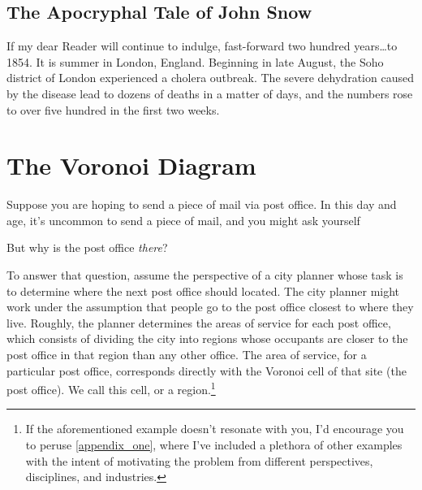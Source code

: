 \documentclass[12pt,twoside]{reedthesis}
\begin{document}
  \section{The Apocryphal Tale of John Snow} %
  \label{sec:the_apocryphal_tale_of_john_snow}
  If my dear Reader will continue to indulge, fast-forward two hundred years\ldots to 1854. It is summer in London, England. Beginning in late August, the Soho district of London experienced a cholera outbreak. The severe dehydration caused by the disease lead to dozens of deaths in a matter of days, and the numbers rose to over five hundred in the first two weeks. 

  


  \chapter*{The Voronoi Diagram}
    \setcounter{chapter}{2}
    \setcounter{section}{0}
  Suppose you are hoping to send a piece of mail via post office. In this day and age, it's uncommon to send a piece of mail, and you might ask yourself  \par
  But why is the post office \emph{there}? \par
  To answer that question, assume the perspective of a city planner whose task is to determine where the next post office should located. The city planner might work under the assumption that people go to the post office closest to where they live. Roughly, the planner determines the areas of service for each post office, which consists of dividing the city into regions whose occupants are closer to the post office in that region than any other office. The area of service, for a particular post office, corresponds directly with the Voronoi cell of that site (the post office). We call this cell, or a region.\footnote{If the aforementioned example doesn't resonate with you, I'd encourage you to peruse \cref{appendix_one}, where I've included a plethora of other examples with the intent of motivating the problem from different perspectives, disciplines, and industries.}\par
\end{document}
